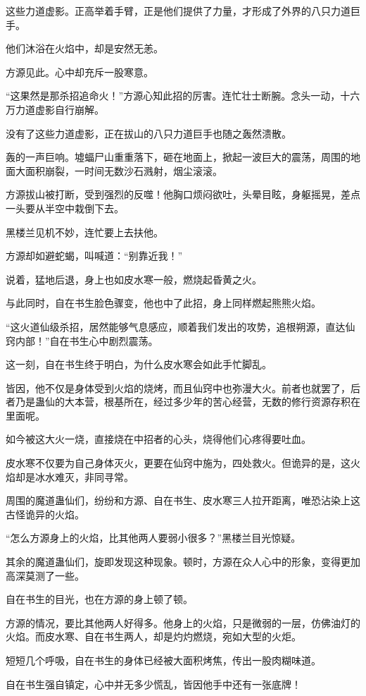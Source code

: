 \begin{this_body}
这些力道虚影。正高举着手臂，正是他们提供了力量，才形成了外界的八只力道巨手。

他们沐浴在火焰中，却是安然无恙。

方源见此。心中却充斥一股寒意。

“这果然是那杀招追命火！”方源心知此招的厉害。连忙壮士断腕。念头一动，十六万力道虚影自行崩解。

没有了这些力道虚影，正在拔山的八只力道巨手也随之轰然溃散。

轰的一声巨响。墟蝠尸山重重落下，砸在地面上，掀起一波巨大的震荡，周围的地面大面积崩裂，一时间无数沙石溅射，烟尘滚滚。

方源拔山被打断，受到强烈的反噬！他胸口烦闷欲吐，头晕目眩，身躯摇晃，差点一头要从半空中栽倒下去。

黑楼兰见机不妙，连忙要上去扶他。

方源却如避蛇蝎，叫喊道：“别靠近我！”

说着，猛地后退，身上也如皮水寒一般，燃烧起昏黄之火。

与此同时，自在书生脸色骤变，他也中了此招，身上同样燃起熊熊火焰。

“这火道仙级杀招，居然能够气息感应，顺着我们发出的攻势，追根朔源，直达仙窍内部！”自在书生心中剧烈震荡。

这一刻，自在书生终于明白，为什么皮水寒会如此手忙脚乱。

皆因，他不仅是身体受到火焰的烧烤，而且仙窍中也弥漫大火。前者也就罢了，后者乃是蛊仙的大本营，根基所在，经过多少年的苦心经营，无数的修行资源存积在里面呢。

如今被这大火一烧，直接烧在中招者的心头，烧得他们心疼得要吐血。

皮水寒不仅要为自己身体灭火，更要在仙窍中施为，四处救火。但诡异的是，这火焰却是冰水难灭，非同寻常。

周围的魔道蛊仙们，纷纷和方源、自在书生、皮水寒三人拉开距离，唯恐沾染上这古怪诡异的火焰。

“怎么方源身上的火焰，比其他两人要弱小很多？”黑楼兰目光惊疑。

其余的魔道蛊仙们，旋即发现这种现象。顿时，方源在众人心中的形象，变得更加高深莫测了一些。

自在书生的目光，也在方源的身上顿了顿。

方源的情况，要比其他两人好得多。他身上的火焰，只是微弱的一层，仿佛油灯的火焰。而皮水寒、自在书生两人，却是灼灼燃烧，宛如大型的火炬。

短短几个呼吸，自在书生的身体已经被大面积烤焦，传出一股肉糊味道。

自在书生强自镇定，心中并无多少慌乱，皆因他手中还有一张底牌！


\end{this_body}
